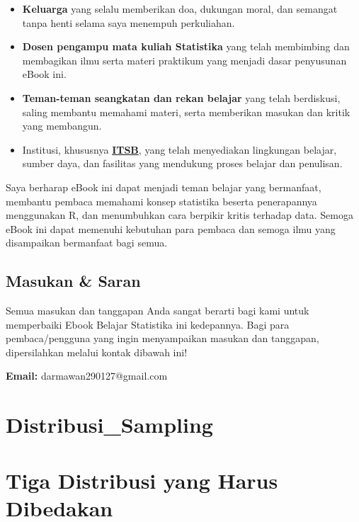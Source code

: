 \documentclass[
  indonesian,
  letterpaper,
]{book}
\providecommand{\tightlist}{%
  \setlength{\itemsep}{0pt}\setlength{\parskip}{0pt}}
\begin{document}
\begin{itemize}
\tightlist
\item
  \textbf{Keluarga} yang selalu memberikan doa, dukungan moral, dan
  semangat tanpa henti selama saya menempuh perkuliahan.
\item
  \textbf{Dosen pengampu mata kuliah Statistika} yang telah membimbing
  dan membagikan ilmu serta materi praktikum yang menjadi dasar
  penyusunan eBook ini.
\item
  \textbf{Teman-teman seangkatan dan rekan belajar} yang telah
  berdiskusi, saling membantu memahami materi, serta memberikan masukan
  dan kritik yang membangun.
\item
  Institusi, khususnya \textbf{\href{https://itsb.ac.id/}{ITSB}}, yang
  telah menyediakan lingkungan belajar, sumber daya, dan fasilitas yang
  mendukung proses belajar dan penulisan.
\end{itemize}

Saya berharap eBook ini dapat menjadi teman belajar yang bermanfaat,
membantu pembaca memahami konsep statistika beserta penerapannya
menggunakan R, dan menumbuhkan cara berpikir kritis terhadap data.
Semoga eBook ini dapat memenuhi kebutuhan para pembaca dan semoga ilmu
yang disampaikan bermanfaat bagi semua.

\section*{Masukan \& Saran}\label{masukan-saran}


Semua masukan dan tanggapan Anda sangat berarti bagi kami untuk
memperbaiki Ebook Belajar Statistika ini kedepannya. Bagi para
pembaca/pengguna yang ingin menyampaikan masukan dan tanggapan,
dipersilahkan melalui kontak dibawah ini!

\textbf{Email:} darmawan290127@gmail.com


\chapter{Distribusi\_Sampling}\label{distribusi_sampling}


\chapter{Tiga Distribusi yang Harus
Dibedakan}\label{tiga-distribusi-yang-harus-dibedakan}
\end{document}
